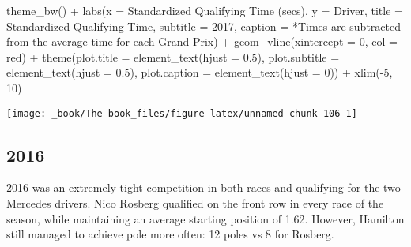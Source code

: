 \documentclass[
]{book}
\newenvironment{Shaded}{\begin{snugshade}}{\end{snugshade}}
\newcommand{\AttributeTok}[1]{\textcolor[rgb]{0.77,0.63,0.00}{#1}}
\newcommand{\DecValTok}[1]{\textcolor[rgb]{0.00,0.00,0.81}{#1}}
\newcommand{\FloatTok}[1]{\textcolor[rgb]{0.00,0.00,0.81}{#1}}
\newcommand{\FunctionTok}[1]{\textcolor[rgb]{0.00,0.00,0.00}{#1}}
\newcommand{\NormalTok}[1]{#1}
\newcommand{\SpecialCharTok}[1]{\textcolor[rgb]{0.00,0.00,0.00}{#1}}
\newcommand{\StringTok}[1]{\textcolor[rgb]{0.31,0.60,0.02}{#1}}
\begin{document}
\begin{Shaded}
\begin{Highlighting}[]
  \FunctionTok{theme\_bw}\NormalTok{() }\SpecialCharTok{+}
  \FunctionTok{labs}\NormalTok{(}\AttributeTok{x =} \StringTok{\textquotesingle{}Standardized Qualifying Time (secs)\textquotesingle{}}\NormalTok{,}
       \AttributeTok{y =} \StringTok{\textquotesingle{}Driver\textquotesingle{}}\NormalTok{,}
       \AttributeTok{title =} \StringTok{\textquotesingle{}Standardized Qualifying Time\textquotesingle{}}\NormalTok{,}
       \AttributeTok{subtitle =} \StringTok{\textquotesingle{}2017\textquotesingle{}}\NormalTok{,}
       \AttributeTok{caption =} \StringTok{\textquotesingle{}*Times are subtracted from the average time for each Grand Prix\textquotesingle{}}\NormalTok{) }\SpecialCharTok{+}
  \FunctionTok{geom\_vline}\NormalTok{(}\AttributeTok{xintercept =} \DecValTok{0}\NormalTok{, }\AttributeTok{col =} \StringTok{\textquotesingle{}red\textquotesingle{}}\NormalTok{) }\SpecialCharTok{+}
  \FunctionTok{theme}\NormalTok{(}\AttributeTok{plot.title =} \FunctionTok{element\_text}\NormalTok{(}\AttributeTok{hjust =} \FloatTok{0.5}\NormalTok{),}
        \AttributeTok{plot.subtitle =} \FunctionTok{element\_text}\NormalTok{(}\AttributeTok{hjust =} \FloatTok{0.5}\NormalTok{),}
        \AttributeTok{plot.caption =} \FunctionTok{element\_text}\NormalTok{(}\AttributeTok{hjust =} \DecValTok{0}\NormalTok{)) }\SpecialCharTok{+}
  \FunctionTok{xlim}\NormalTok{(}\SpecialCharTok{{-}}\DecValTok{5}\NormalTok{, }\DecValTok{10}\NormalTok{)}
\end{Highlighting}
\end{Shaded}

\begin{center}\texttt{[image: \_book/The-book\_files/figure-latex/unnamed-chunk-106-1]} \end{center}

\hypertarget{section-7}{%
\subsection{2016}\label{section-7}}

2016 was an extremely tight competition in both races and qualifying for the two Mercedes drivers. Nico Rosberg qualified on the front row in every race of the season, while maintaining an average starting position of 1.62. However, Hamilton still managed to achieve pole more often: 12 poles vs 8 for Rosberg.
\end{document}
